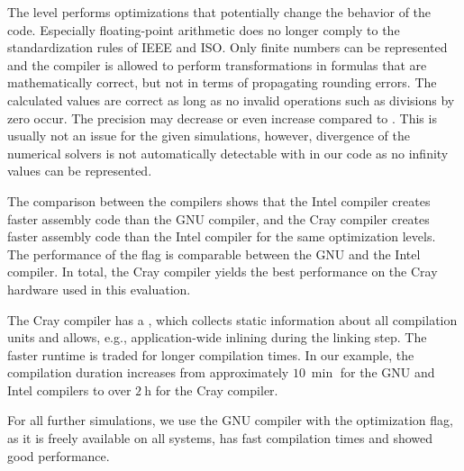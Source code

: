 The  level performs optimizations that potentially change the behavior of the code. 
Especially floating-point arithmetic does no longer comply to the standardization rules of IEEE and ISO. Only finite numbers can be represented and the compiler is allowed to perform transformations in formulas that are mathematically correct, but not in terms of propagating rounding errors. The calculated values are correct as long as no invalid operations such as divisions by zero occur. The precision may decrease or even increase compared to . This is usually not an issue for the given simulations, however, divergence of the numerical solvers is not automatically detectable with  in our code as no infinity values can be represented.

The comparison between the compilers shows that the Intel compiler creates faster assembly code than the GNU compiler, and the Cray compiler creates faster assembly code than the Intel compiler for the same optimization levels. The performance of the  flag is comparable between the GNU and the Intel compiler. In total, the Cray compiler yields the best performance on the Cray hardware used in this evaluation. 

The Cray compiler has a , which collects static information about all compilation units and allows, e.g., application-wide inlining during the linking step. The faster runtime is traded for longer compilation times. In our example, the compilation duration increases from approximately $\SI{10}{\min}$ for the GNU and Intel compilers to over $\SI{2}{\hour}$ for the Cray compiler.

For all further simulations, we use the GNU compiler with the  optimization flag, as it is freely available on all systems, has fast compilation times and showed good performance.

